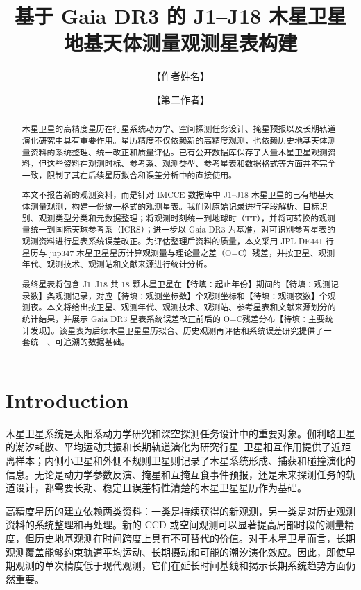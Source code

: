 \documentclass{aastex701}
\newcommand{\oc}{O$-$C}
\begin{document}
\title{基于 Gaia DR3 的 J1--J18 木星卫星地基天体测量观测星表构建}

\author{【作者姓名】}

\author{【第二作者】}

\begin{abstract}
木星卫星的高精度星历在行星系统动力学、空间探测任务设计、掩星预报以及长期轨道演化研究中具有重要作用。星历精度不仅依赖新的高精度观测，也依赖历史地基天体测量资料的系统整理、统一改正和质量评估。已有公开数据库保存了大量木星卫星观测资料，但这些资料在观测时标、参考系、观测类型、参考星表和数据格式等方面并不完全一致，限制了其在后续星历拟合和误差分析中的直接使用。

本文不报告新的观测资料，而是针对 IMCCE 数据库中 J1--J18 木星卫星的已有地基天体测量观测，构建一份统一格式的观测星表。我们对原始记录进行字段解析、目标识别、观测类型分类和元数据整理；将观测时刻统一到地球时（TT），并将可转换的观测量统一到国际天球参考系（ICRS）；进一步以 Gaia DR3 为基准，对可识别参考星表的观测资料进行星表系统误差改正。为评估整理后资料的质量，本文采用 JPL DE441 行星历与 jup347 木星卫星星历计算观测量与理论量之差（\oc）残差，并按卫星、观测年代、观测技术、观测站和文献来源进行统计分析。

最终星表将包含 J1--J18 共 18 颗木星卫星在【待填：起止年份】期间的【待填：观测记录数】条观测记录，对应【待填：观测坐标数】个观测坐标和【待填：观测夜数】个观测夜。本文将给出按卫星、观测年代、观测技术、观测站、参考星表和文献来源划分的统计结果，并展示 Gaia DR3 星表系统误差改正前后的 \oc 残差分布【待填：主要统计发现】。该星表为后续木星卫星星历拟合、历史观测再评估和系统误差研究提供了一套统一、可追溯的数据基础。
\end{abstract}


\section{Introduction} \label{sec:intro}

木星卫星系统是太阳系动力学研究和深空探测任务设计中的重要对象。伽利略卫星的潮汐耗散、平均运动共振和长期轨道演化为研究行星--卫星相互作用提供了近距离样本；内侧小卫星和外侧不规则卫星则记录了木星系统形成、捕获和碰撞演化的信息。无论是动力学参数反演、掩星和互掩互食事件预报，还是未来探测任务的轨道设计，都需要长期、稳定且误差特性清楚的木星卫星星历作为基础。

高精度星历的建立依赖两类资料：一类是持续获得的新观测，另一类是对历史观测资料的系统整理和再处理。新的 CCD 或空间观测可以显著提高局部时段的测量精度，但历史地基观测在时间跨度上具有不可替代的价值。对于木星卫星而言，长期观测覆盖能够约束轨道平均运动、长期摄动和可能的潮汐演化效应。因此，即使早期观测的单次精度低于现代观测，它们在延长时间基线和揭示长期系统趋势方面仍然重要。
\end{document}

